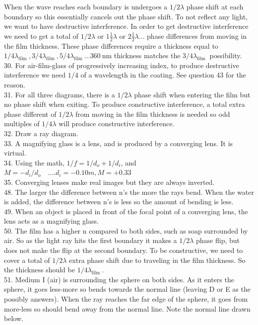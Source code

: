 \begin{enumerate}
When the wave reaches each boundary is undergoes a $1 / 2 \lambda$ phase shift at each boundary so this essentially cancels out the phase shift. To not reflect any light, we want to have destructive interference. In order to get destructive interference we need to get a total of $1 / 2 \lambda$ or $1 \frac{1}{2} \lambda$ or $2 \frac{1}{2} \lambda \ldots$ phase differences from moving in the film thickness. These phase differences require a thickness equal to $1 / 4 \lambda_{\text {film }}, 3 / 4 \lambda_{\text {film }}, 5 / 4 \lambda_{\text {film }} \ldots 360 \mathrm{~nm}$ thickness matches the $3 / 4 \lambda_{\text {film }}$ possibility.\\
30. For air-film-glass of progressively increasing index, to produce destructive interference we need $1 / 4$ of a wavelength in the coating. See question 43 for the reason.\\
31. For all three diagrams, there is a $1 / 2 \lambda$ phase shift when entering the film but no phase shift when exiting. To produce constructive interference, a total extra phase different of $1 / 2 \lambda$ from moving in the film thickness is needed so odd multiples of $1 / 4 \lambda$ will produce constructive interference.\\
32. Draw a ray diagram.\\
33. A magnifying glass is a lens, and is produced by a converging lens. It is virtual.\\
34. Using the math, $1 / f=1 / d_{o}+1 / d_{i}$, and $M=-d_{i} / d_{o} \quad \ldots . d_{i}=-0.10 m, M=+0.33$\\
35. Converging lenses make real images but they are always inverted.\\
48. The larger the difference between n's the more the rays bend. When the water is added, the difference between n's is less so the amount of bending is less.\\
49. When an object is placed in front of the focal point of a converging lens, the lens acts as a magnifying glass.\\
50. The film has a higher n compared to both sides, such as soap surrounded by air. So as the light ray hits the first boundary it makes a $1 / 2 \lambda$ phase flip, but does not make the flip at the second boundary. To be constructive, we need to cover a total of $1 / 2 \lambda$ extra phase shift due to traveling in the film thickness. So the thickness should be $1 / 4 \lambda_{\text {film }}$.\\
51. Medium I (air) is surrounding the sphere on both sides. As it enters the sphere, it goes less-more so bends towards the normal line (leaving D or E as the possibly answers). When the ray reaches the far edge of the sphere, it goes from more-less so should bend away from the normal line. Note the normal line drawn below.\\

\end{enumerate}
